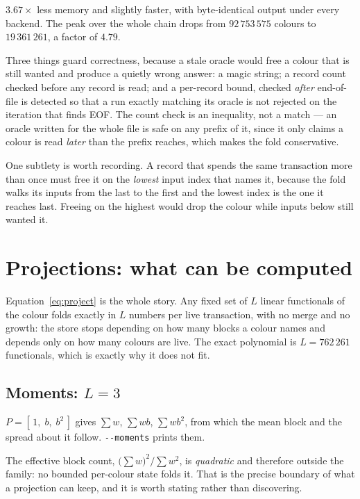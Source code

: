 \documentclass[11pt,a4paper]{article}
\newcommand{\flag}[1]{\texttt{-{}-#1}}
\begin{document}
$3.67\times$ less memory and slightly faster, with byte-identical output under
every backend. The peak over the whole chain drops from $92\,753\,575$ colours
to $19\,361\,261$, a factor of $4.79$.

Three things guard correctness, because a stale oracle would free a colour that
is still wanted and produce a quietly wrong answer: a magic string; a record
count checked before any record is read; and a per-record bound, checked
\emph{after} end-of-file is detected so that a run exactly matching its oracle
is not rejected on the iteration that finds EOF. The count check is an
inequality, not a match --- an oracle written for the whole file is safe on any
prefix of it, since it only claims a colour is read \emph{later} than the prefix
reaches, which makes the fold conservative.

One subtlety is worth recording. A record that spends the same transaction more
than once must free it on the \emph{lowest} input index that names it, because
the fold walks its inputs from the last to the first and the lowest index is the
one it reaches last. Freeing on the highest would drop the colour while inputs
below still wanted it.

\section{Projections: what can be computed}
\label{sec:projections}

Equation~\eqref{eq:project} is the whole story. Any fixed set of $L$ linear
functionals of the colour folds exactly in $L$ numbers per live transaction,
with no merge and no growth: the store stops depending on how many blocks a
colour names and depends only on how many colours are live. The exact polynomial
is $L = 762\,261$ functionals, which is exactly why it does not fit.

\subsection{Moments: $L=3$}

$P = [\,1,\; b,\; b^2\,]$ gives $\sum w$, $\sum wb$, $\sum wb^2$, from which the
mean block and the spread about it follow. \flag{moments} prints them.

The effective block count, $\big(\sum w\big)^2/\sum w^2$, is \emph{quadratic} and
therefore outside the family: no bounded per-colour state folds it. That is the
precise boundary of what a projection can keep, and it is worth stating rather
than discovering.
\end{document}
